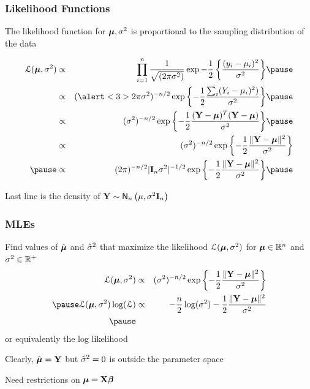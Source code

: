 \documentclass{beamer}
\begin{document}
\begin{frame} \frametitle{Likelihood Functions}

The likelihood function for $\boldsymbol{\mu}, \sigma^2$ is proportional to the
sampling distribution of the data \pause

\begin{eqnarray*}
 \cL(\mub, \sigma^2) & \propto & \prod_{i = 1}^n \frac{1}{\sqrt{(2 \pi
                                 \sigma^2)}} \exp{- \frac{1}{2}\left\{ \frac{( y_i
                                 - \mu_i)^2}{\sigma^2} \right\}}
                                 \pause \\
 & \propto & (\alert<3>{2 \pi} \sigma^2)^{-n/2} 
 \exp{\left\{ - \frac 1 2  \frac{ \sum_i(Y_i - \mu_i)^2 )}{\sigma^2} 
\right\}}  \pause \\
 & \propto & ( \sigma^2)^{-n/2} 
 \exp{\left\{ - \frac 1 2 \frac{(\Y - \mub)^T (\Y - \mub)}{\sigma^2} 
\right\}}  \pause \\
   & \propto & (\sigma^2)^{-n/2} 
 \exp{\left\{ - \frac 1 2 \frac{\| \Y - \mub \|^2}{\sigma^2} 
\right\}} \\ \pause
  & \propto &  (2 \pi)^{-n/2}
| \I_n\sigma^2|^{-1/2}  
 \exp{\left\{ - \frac 1 2 \frac{\| \Y - \mub \|^2}{\sigma^2} 
\right\}}  \pause
\end{eqnarray*}

Last line is the density of $\mathbf{Y} \sim \textsf{N}_n\left(\mu, \sigma^2 \mathbf{I}_n\right)$
\end{frame}

\begin{frame} \frametitle{MLEs}

Find values of $\hat{\boldsymbol{\mu}}$ and ${\hat{\sigma}}^2$ that maximize the likelihood
${\cal{L}}(\boldsymbol{\mu}, \sigma^2)$ for $\boldsymbol{\mu} \in \mathbb{R}^n$ and $\sigma^2 \in \mathbb{R}^+$
\pause
  \begin{eqnarray*}
 \cL(\mub, \sigma^2) 
    & \propto & (\sigma^2)^{-n/2} 
 \exp{\left\{ - \frac 1 2 \frac{\| \Y - \mub \|^2}{\sigma^2} 
\right\}} \\ \pause
 \cL(\mub, \sigma^2) 
\log(\cL)   & \propto & -\frac{n}{2} \log(\sigma^2)  - \frac 1 2 \frac{\| \Y - \mub \|^2}{\sigma^2} 
 \\ \pause
\end{eqnarray*}
or equivalently the log likelihood


\vspace{18pt}
Clearly, $\hat{\boldsymbol{\mu}} = \mathbf{Y}$ but ${\hat{\sigma}}^2 = 0$  is outside the parameter space
\vspace{18pt}

Need restrictions on $\boldsymbol{\mu} = \mathbf{X}\boldsymbol{\beta}$

\end{frame}
\end{document}
